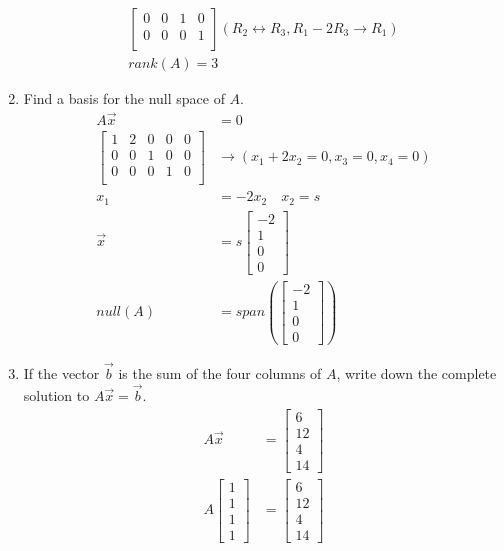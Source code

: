 \documentclass{math}
\begin{document}
\begin{enumerate}
\begin{align*}
\begin{bmatrix}
      0 & 0 & 1 & 0 \\
      0 & 0 & 0 & 1 \\
    \end{bmatrix} (R_2\leftrightarrow R_3, R_1-2R_3 \to R_1) \\
    rank(A) = 3
  \end{align*}
  \item Find a basis for the null space of \( A \).
  \begin{align*}
    A\vec{x} &= 0 \\
    \begin{bmatrix}
      1 & 2 & 0 & 0 & 0 \\
      0 & 0 & 1 & 0 & 0 \\
      0 & 0 & 0 & 1 & 0 \\
    \end{bmatrix} &\to (x_1+2x_2 = 0, x_3 = 0, x_4 = 0) \\
    x_1 &= -2x_2 \quad x_2 = s \\
    \vec{x} &= s\begin{bmatrix}
      -2 \\ 1 \\ 0 \\ 0
    \end{bmatrix} \\
    null(A) &= span\left(\begin{bmatrix}
      -2 \\ 1 \\ 0 \\ 0
    \end{bmatrix}\right)
  \end{align*}
  \item If the vector \( \vec{b} \) is the sum of the four columns of \( A \),
  write down the complete solution to \( A\vec{x} = \vec{b} \).
  \begin{align*}
    A\vec{x} &= \begin{bmatrix}6 \\ 12 \\ 4 \\ 14\end{bmatrix} \\
    A\begin{bmatrix}1 \\ 1 \\ 1 \\ 1\end{bmatrix} &=
      \begin{bmatrix}6 \\ 12 \\ 4 \\ 14\end{bmatrix}
  \end{align*}
\end{enumerate}
\end{document}

